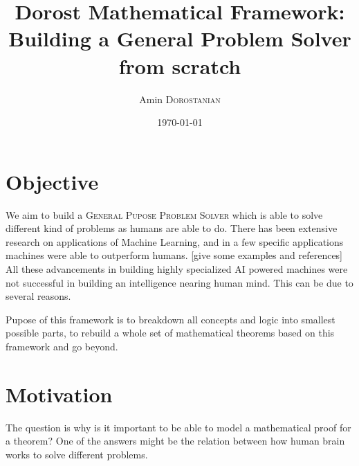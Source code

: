 \documentclass{article}
\title{Dorost Mathematical Framework: Building a General Problem Solver from scratch} %
\author{Amin \textsc{Dorostanian}} %
\date{\today} %
\begin{document}
\maketitle %




\section{Objective}

We aim to build a \textsc{General Pupose Problem Solver} which is able to solve different kind of problems as humans
are able to do. There has been extensive research on applications of Machine Learning, and in a few specific applications machines were able to outperform humans. [give some examples and references]\\

All these advancements in building highly specialized AI powered machines were not successful in building an intelligence nearing human mind. This can be due to several reasons.


Pupose of this framework is to breakdown all concepts and logic into smallest possible parts, to rebuild a whole set of mathematical theorems based on this framework and go beyond.




\section{Motivation}
The question is why is it important to be able to model a mathematical proof for a theorem?
One of the answers might be the relation between how human brain works to solve different problems.
\end{document}
